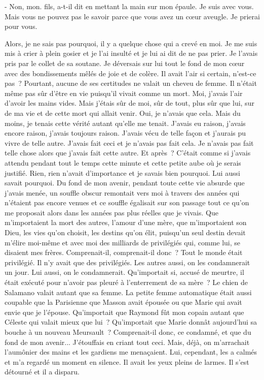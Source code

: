 \documentclass[french,twoside]{book} %
\begin{document}
- Non, mon. fils, a-t-il dit en mettant la main sur mon épaule. Je suis avec vous. Mais vous ne pouvez pas le savoir parce que vous avez un cœur aveugle. Je prierai pour vous.\par
Alors, je ne sais pas pourquoi, il y a quelque chose qui a crevé en moi. Je me suis mis à crier à plein gosier et je l’ai insulté et je lui ai dit de ne pas prier. Je l’avais pris par le collet de sa soutane. Je déversais sur lui tout le fond de mon cœur avec des bondissements mêlés de joie et de colère. Il avait l’air si certain, n’est-ce pas ? Pourtant, aucune de ses certitudes ne valait un cheveu de femme. Il n’était même pas sûr d’être en vie puisqu’il vivait comme un mort. Moi, j’avais l’air d’avoir les mains vides. Mais j’étais sûr de moi, sûr de tout, plus sûr que lui, sur de ma vie et de cette mort qui allait venir. Oui, je n’avais que cela. Mais du moins, je tenais cette vérité autant qu’elle me tenait. J'avais eu raison, j’avais encore raison, j’avais toujours raison. J'avais vécu de telle façon et j’aurais pu vivre de telle autre. J'avais fait ceci et je n’avais pas fait cela. Je n’avais pas fait telle chose alors que j’avais fait cette autre. Et après ? C'était comme si j’avais attendu pendant tout le temps cette minute et cette petite aube où je serais justifié. Rien, rien n’avait d’importance et je savais bien pourquoi. Lui aussi savait pourquoi. Du fond de mon avenir, pendant toute cette vie absurde que j’avais menée, un souffle obscur remontait vers moi à travers des années qui n’étaient pas encore venues et ce souffle égalisait sur son passage tout ce qu’on me proposait alors dans les années pas plus réelles que je vivais. Que m’importaient la mort des autres, l’amour d’une mère, que m’importaient son Dieu, les vies qu’on choisit, les destins qu’on élit, puisqu’un seul destin devait m’élire moi-même et avec moi des milliards de privilégiés qui, comme lui, se disaient mes frères. Comprenait-il, comprenait-il donc ? Tout le monde était privilégié. Il n’y avait que des privilégiés. Les autres aussi, on les condamnerait un jour. Lui aussi, on le condamnerait. Qu'importait si, accusé de meurtre, il était exécuté pour n’avoir pas pleuré à l’enterrement de sa mère ? Le chien de Salamano valait autant que sa femme. La petite femme automatique était aussi coupable que la Parisienne que Masson avait épousée ou que Marie qui avait envie que je l’épouse. Qu'importait que Raymond fût mon copain autant que Céleste qui valait mieux que lui ? Qu'importait que Marie donnât aujourd’hui sa bouche à un nouveau Meursault ? Comprenait-il donc, ce condamné, et que du fond de mon avenir... J'étouffais en criant tout ceci. Mais, déjà, on m’arrachait l’aumônier des mains et les gardiens me menaçaient. Lui, cependant, les a calmés et m’a regardé un moment en silence. Il avait les yeux pleins de larmes. Il s’est détourné et il a disparu.\par
\end{document}
